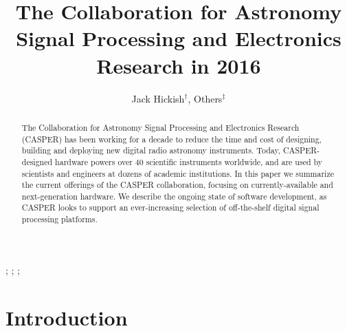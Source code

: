 \documentclass{ws-jai}
\begin{document}
\catchline{}{}{}{}{} %


\title{The Collaboration for Astronomy Signal Processing and Electronics Research in 2016}

\author{Jack Hickish$^\dagger$, Others$^\ddagger$}

\address{
$^\dagger$Radio Astronomy Laboratory, UC Berkeley, Berkeley, CA 94720, USA, jackh@astro.berkeley.edu\\
$^\ddagger$Group, Company, Address, City, State ZIP/Zone, Country\\
$^\S$Group, Company, Address, City, State ZIP/Zone, Country, fauthor@company.com
}

\maketitle


\begin{history}
;
;
;
\end{history}

\begin{abstract}

The Collaboration for Astronomy Signal Processing and Electronics Research
(CASPER) has been working for a decade to reduce the time and cost of designing,
building and deploying new digital radio astronomy instruments.  Today,
CASPER-designed hardware powers over 40 scientific instruments worldwide, and
are used by scientists and engineers at dozens of academic institutions.  In this paper
we summarize the current offerings of the CASPER collaboration, focusing on
currently-available and next-generation hardware.  We describe the ongoing state
of software development, as CASPER looks to support an ever-increasing selection
of off-the-shelf digital signal processing platforms.

\end{abstract}


\section{Introduction}
\end{document}
